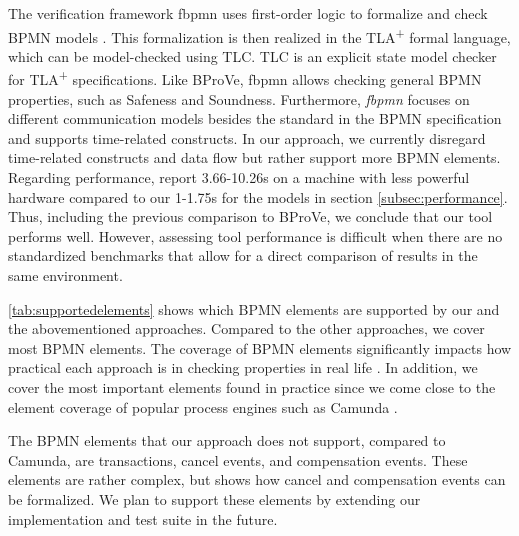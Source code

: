 \documentclass{lmcs} %
\begin{document}
The verification framework \textsf{fbpmn} uses first-order logic to formalize and check BPMN models \cite{houhouFirstOrderLogicVerification2022}.
This formalization is then realized in the TLA\textsuperscript{+} formal language, which can be model-checked using TLC.
TLC is an explicit state model checker for TLA\textsuperscript{+} specifications.
Like BProVe, \textsf{fbpmn} allows checking general BPMN properties, such as Safeness and Soundness.
Furthermore, \textit{fbpmn} focuses on different communication models besides the standard in the BPMN specification and supports time-related constructs.
In our approach, we currently disregard time-related constructs \cite{duranVerifyingTimedBPMN2017,houhouFirstOrderLogicVerification2022} and data flow \cite{corradiniFormalisingAnimatingMultiple2022,el-saberCMMICMComplianceChecking2015} but rather support more BPMN elements.
Regarding performance, \cite{houhouFirstOrderLogicVerification2022} report 3.66-10.26s on a machine with less powerful hardware compared to our 1-1.75s for the models in section \autoref{subsec:performance}.
Thus, including the previous comparison to BProVe, we conclude that our tool performs well.
However, assessing tool performance is difficult when there are no standardized benchmarks that allow for a direct comparison of results in the same environment.

\autoref{tab:supportedelements} shows which BPMN elements are supported by our and the abovementioned approaches.
Compared to the other approaches, we cover most BPMN elements.
The coverage of BPMN elements significantly impacts how practical each approach is in checking properties in real life \cite{fahlandAnalysisDemandInstantaneous2011}.
In addition, we cover the most important elements found in practice since we come close to the element coverage of popular process engines such as Camunda \cite{camundaservicesgmbhBPMNImplementationReference2023}.

The BPMN elements that our approach does not support, compared to Camunda, are transactions, cancel events, and compensation events.
These elements are rather complex, but \cite{vangorpVisualTokenbasedFormalization2013} shows how cancel and compensation events can be formalized.
We plan to support these elements by extending our implementation and test suite in the future.
\end{document}
